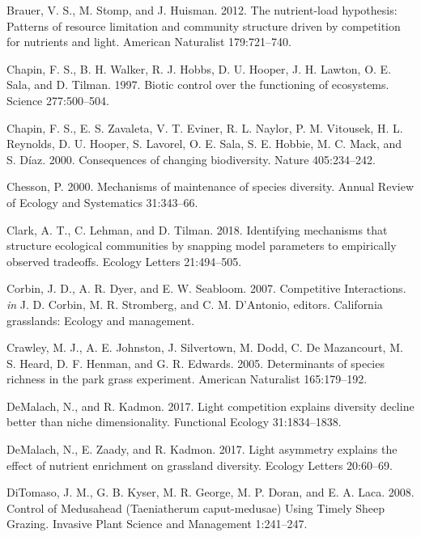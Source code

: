 \documentclass[twoside,12pt,final]{ucthesis-CA2012}
\begin{document}
\begin{ucmainmatter}
\leavevmode\hypertarget{ref-Brauer2012}{}%
Brauer, V. S., M. Stomp, and J. Huisman. 2012. The nutrient-load hypothesis: Patterns of resource limitation and community structure driven by competition for nutrients and light. American Naturalist 179:721--740.

\leavevmode\hypertarget{ref-Chapin1997}{}%
Chapin, F. S., B. H. Walker, R. J. Hobbs, D. U. Hooper, J. H. Lawton, O. E. Sala, and D. Tilman. 1997. Biotic control over the functioning of ecosystems. Science 277:500--504.

\leavevmode\hypertarget{ref-Chapin2000}{}%
Chapin, F. S., E. S. Zavaleta, V. T. Eviner, R. L. Naylor, P. M. Vitousek, H. L. Reynolds, D. U. Hooper, S. Lavorel, O. E. Sala, S. E. Hobbie, M. C. Mack, and S. Díaz. 2000. Consequences of changing biodiversity. Nature 405:234--242.

\leavevmode\hypertarget{ref-Chesson2000}{}%
Chesson, P. 2000. Mechanisms of maintenance of species diversity. Annual Review of Ecology and Systematics 31:343--66.

\leavevmode\hypertarget{ref-Clark2018}{}%
Clark, A. T., C. Lehman, and D. Tilman. 2018. Identifying mechanisms that structure ecological communities by snapping model parameters to empirically observed tradeoffs. Ecology Letters 21:494--505.

\leavevmode\hypertarget{ref-Corbin2007}{}%
Corbin, J. D., A. R. Dyer, and E. W. Seabloom. 2007. Competitive Interactions. \emph{in} J. D. Corbin, M. R. Stromberg, and C. M. D'Antonio, editors. California grasslands: Ecology and management.

\leavevmode\hypertarget{ref-Crawley2005}{}%
Crawley, M. J., A. E. Johnston, J. Silvertown, M. Dodd, C. De Mazancourt, M. S. Heard, D. F. Henman, and G. R. Edwards. 2005. Determinants of species richness in the park grass experiment. American Naturalist 165:179--192.

\leavevmode\hypertarget{ref-DeMalach2017b}{}%
DeMalach, N., and R. Kadmon. 2017. Light competition explains diversity decline better than niche dimensionality. Functional Ecology 31:1834--1838.

\leavevmode\hypertarget{ref-DeMalach2017a}{}%
DeMalach, N., E. Zaady, and R. Kadmon. 2017. Light asymmetry explains the effect of nutrient enrichment on grassland diversity. Ecology Letters 20:60--69.

\leavevmode\hypertarget{ref-DiTomaso2008}{}%
DiTomaso, J. M., G. B. Kyser, M. R. George, M. P. Doran, and E. A. Laca. 2008. Control of Medusahead (Taeniatherum caput-medusae) Using Timely Sheep Grazing. Invasive Plant Science and Management 1:241--247.


\end{ucmainmatter}
\end{document}
